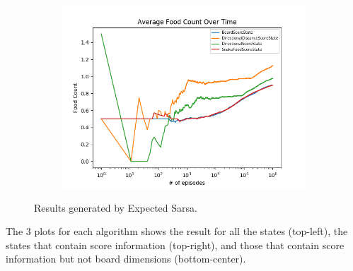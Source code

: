 \documentclass[result.tex]{subfiles}
\begin{document}
\begin{figure}[ht]
        \begin{subfigure}[b]{.35\linewidth}
            \includegraphics[width=\linewidth]{../images/expected_sarsa/state/234/score_average_food_count_over_time.png}
        \end{subfigure}
        \caption{Results generated by Expected Sarsa.}
        \label{fig:state_result_expected_sarsa}
    \end{figure}

    The 3 plots for each algorithm shows the result for all the states (top-left), the states that contain score information (top-right), and those that contain score information but not board dimensions (bottom-center).
\end{document}
